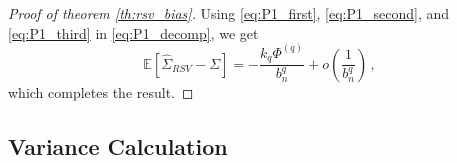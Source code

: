 \documentclass[11pt]{article}
\theoremstyle{remark}
\begin{document}
\begin{proof}[Proof of theorem \ref{th:rsv_bias}]
%
Using \eqref{eq:P1_first}, \eqref{eq:P1_second}, and \eqref{eq:P1_third} in \eqref{eq:P1_decomp}, we get
\[
\mathbb{E} \left[\hat{\Sigma}_{RSV} - \Sigma \right] = -\dfrac{k_q \Phi^{(q)} }{b_n^q} + o\left( \dfrac{1}{b_n^q} \right)\,,
\]
which completes the result.
%
\end{proof}
\subsection{Variance Calculation}
\label{appendix:variance}
 
\end{document}
